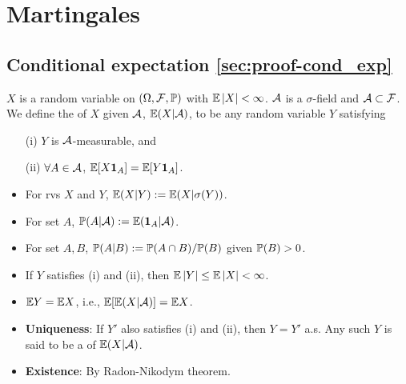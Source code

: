 \documentclass[10pt,a4paper]{article}
\begin{document}
\section{Martingales}\label{sec:martingales}
\subsection{Conditional expectation \ref{sec:proof-cond_exp}}\label{sec:cond_exp}
\begin{defbox}
\begin{definition}\label{def:cond_exp}
	$X$ is a random variable on $(\Omega, {\cal F}, \mathbb P)$ with $\mathbb E\left\lvert X\right\rvert<\infty $. ${\cal A}$ is a $\sigma$-field and ${\cal A}\subset {\cal F}$. We define the  of $X$ given ${\cal A}$, $\mathbb E(X|{\cal A})$, to be any random variable $Y$ satisfying
	\begin{enumerate}
		\item[(i)] $Y$ is ${\cal A}$-measurable, and
		\item[(ii)] $\forall A\in{\cal A}$, $\mathbb E[X{\boldsymbol 1}_A]=\mathbb E[Y{\boldsymbol 1}_A]$.    
	\end{enumerate}
	\begin{itemize}
		\item For rvs $X$ and $Y$, $\mathbb E(X|Y):=\mathbb E(X|\sigma(Y))$. 
		\item For set $A$, $\mathbb P(A|{\cal A}):=\mathbb E({\boldsymbol 1}_A|{\cal A})$.
		\item For set $A,B$, $\mathbb P(A|B):=\mathbb P(A\cap B)/\mathbb P(B)$ given $\mathbb P(B)>0$.     
	\end{itemize}
\end{definition}
\end{defbox}
\begin{itemize}
	\item If $Y$ satisfies (i) and (ii), then $\mathbb E \left\lvert Y\right\rvert \leq \mathbb E\left\lvert X\right\rvert<\infty $. 
	\item $\mathbb E Y = \mathbb E X$, i.e., $\mathbb E[\mathbb E(X|{\cal A})]=\mathbb E X$.
	\item \textbf{Uniqueness}: If $Y'$ also satisfies (i) and (ii), then $Y=Y'$ a.s. Any such $Y$ is said to be a  of $\mathbb E(X|{\cal A})$.
	\item \textbf{Existence}: By Radon-Nikodym theorem.
\end{itemize}
\end{document}
